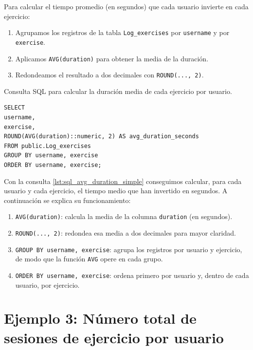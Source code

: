 \documentclass[a4paper, 12pt]{book}
\begin{document}
Para calcular el tiempo promedio (en segundos) que cada usuario invierte en cada ejercicio:

\begin{enumerate}
    \item Agrupamos los registros de la tabla \texttt{Log\_exercises} por \texttt{username} y por \texttt{exercise}.
    \item Aplicamos \texttt{AVG(duration)} para obtener la media de la duración.
    \item Redondeamos el resultado a dos decimales con \texttt{ROUND(..., 2)}.
\end{enumerate}

\begin{listing}[h!]
\caption{Consulta SQL para calcular la duración media de cada ejercicio por usuario.}{}
\label{lst:sql_avg_duration_simple}
\begin{verbatim}
SELECT
username,
exercise,
ROUND(AVG(duration)::numeric, 2) AS avg_duration_seconds
FROM public.Log_exercises
GROUP BY username, exercise
ORDER BY username, exercise;
\end{verbatim}
\end{listing}

Con la consulta \ref{lst:sql_avg_duration_simple} conseguimos calcular, para cada usuario y cada ejercicio, el tiempo medio que han invertido en segundos. A continuación se explica su funcionamiento:

\begin{enumerate}
    \item \texttt{AVG(duration)}: calcula la media de la columna \texttt{duration} (en segundos).
    \item \texttt{ROUND(..., 2)}: redondea esa media a dos decimales para mayor claridad.
    \item \texttt{GROUP BY username, exercise}: agrupa los registros por usuario y ejercicio, de modo que la función \texttt{AVG} opere en cada grupo.
    \item \texttt{ORDER BY username, exercise}: ordena primero por usuario y, dentro de cada usuario, por ejercicio.
    
\end{enumerate}

\section{Ejemplo 3: Número total de sesiones de ejercicio por usuario}
\end{document}
